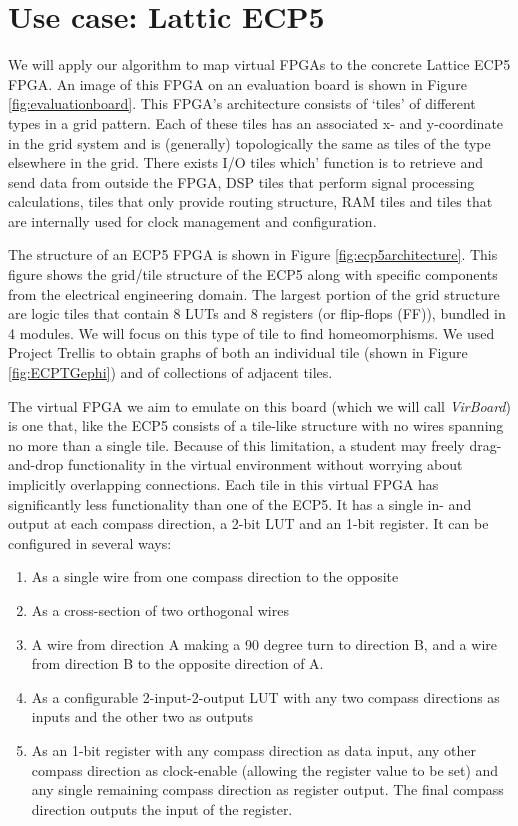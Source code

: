 \chapter{Use case: Lattic ECP5}
We will apply our algorithm to map virtual FPGAs to the concrete Lattice ECP5 FPGA. An image of this FPGA on an evaluation board is shown in Figure \ref{fig:evaluationboard}. This FPGA's architecture consists of `tiles' of different types in a grid pattern. Each of these tiles has an associated x- and y-coordinate in the grid system and is (generally) topologically the same as tiles of the type elsewhere in the grid. There exists I/O tiles which' function is to retrieve and send data from outside the FPGA, DSP tiles that perform signal processing calculations, tiles that only provide routing structure, RAM tiles and tiles that are internally used for clock management and configuration.

The structure of an ECP5 FPGA is shown in Figure \ref{fig:ecp5architecture}. This figure shows the grid/tile structure of the ECP5 along with specific components from the electrical engineering domain. The largest portion of the grid structure are logic tiles that contain 8 LUTs and 8 registers (or flip-flops (FF)), bundled in 4 modules. We will focus on this type of tile to find homeomorphisms. We used Project Trellis\cite{todo} to obtain graphs of both an individual tile (shown in Figure \ref{fig:ECPTGephi}) and of collections of adjacent tiles.

The virtual FPGA we aim to emulate on this board (which we will call \textit{VirBoard}) is one that, like the ECP5 consists of a tile-like structure with no wires spanning no more than a single tile. Because of this limitation, a student may freely drag-and-drop functionality in the virtual environment without worrying about implicitly overlapping connections. Each tile in this virtual FPGA has significantly less functionality than one of the ECP5. It has a single in- and output at each compass direction, a 2-bit LUT and an 1-bit register. It can be configured in several ways:

\begin{enumerate}
\item As a single wire from one compass direction to the opposite
\item As a cross-section of two orthogonal wires
\item A wire from direction A making a 90 degree turn to direction B, and a wire from direction B to the opposite direction of A.
\item As a configurable 2-input-2-output LUT with any two compass directions as inputs and the other two as outputs
\item As an 1-bit register with any compass direction as data input, any other compass direction as clock-enable (allowing the register value to be set) and any single remaining compass direction as register output. The final compass direction outputs the input of the register.
\end{enumerate}

